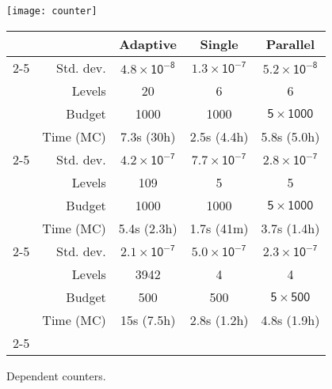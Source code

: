 \documentclass{llncs}
\providecommand{\tabularnewline}{\\}
\begin{document}
\begin{figure}
\begin{minipage}[t]{0.48\columnwidth}\texttt{[image: counter]}

\protect\caption{Dependent counters.\label{fig:counters}}
\end{minipage}\quad{}\begin{minipage}[t]{0.5\columnwidth}\textsf{\scriptsize{}}\begin{tabular}[b]{r|rccc|}
\multicolumn{1}{r}{} &  & \textsf{\scriptsize{}Adaptive} & \textsf{\scriptsize{}Single} & \multicolumn{1}{c}{\textsf{\scriptsize{}Parallel}}\tabularnewline
\cline{2-5} 
\multirow{4}{*}{\begin{turn}{90}
\textsf{\scriptsize{}Leader}
\end{turn}} & \textsf{\scriptsize{}Std. dev.} & \textsf{\scriptsize{}$\mathsf{4.8\times10^{-8}}$} & \textsf{\scriptsize{}$\mathsf{1.3\times10^{-7}}$} & \textsf{\scriptsize{}$\mathsf{5.2\times10^{-8}}$}\tabularnewline
 & \textsf{\scriptsize{}Levels} & \textsf{\scriptsize{}20} & \textsf{\scriptsize{}6} & \textsf{\scriptsize{}6}\tabularnewline
 & \textsf{\scriptsize{}Budget} & \textsf{\scriptsize{}1000} & \textsf{\scriptsize{}1000} & \textsf{\scriptsize{}$\mathsf{5\times1000}$}\tabularnewline
 & \textsf{\scriptsize{}Time (MC)} & \textsf{\scriptsize{}7.3s (30h)} & \textsf{\scriptsize{}2.5s (4.4h)} & \textsf{\scriptsize{}5.8s (5.0h)}\tabularnewline
\cline{2-5} 
\multirow{4}{*}{\begin{turn}{90}
\textsf{\scriptsize{}Philosophers}
\end{turn}} & \textsf{\scriptsize{}Std. dev.} & \textsf{\scriptsize{}$\mathsf{4.2\times10^{-7}}$} & \textsf{\scriptsize{}$\mathsf{7.7\times10^{-7}}$} & \textsf{\scriptsize{}$\mathsf{2.8\times10^{-7}}$}\tabularnewline
 & \textsf{\scriptsize{}Levels} & \textsf{\scriptsize{}109} & \textsf{\scriptsize{}5} & \textsf{\scriptsize{}5}\tabularnewline
 & \textsf{\scriptsize{}Budget} & \textsf{\scriptsize{}1000} & \textsf{\scriptsize{}1000} & \textsf{\scriptsize{}$\mathsf{5\times1000}$}\tabularnewline
 & \textsf{\scriptsize{}Time (MC)} & \textsf{\scriptsize{}5.4s (2.3h)} & \textsf{\scriptsize{}1.7s (41m)} & \textsf{\scriptsize{}3.7s (1.4h)}\tabularnewline
\cline{2-5} 
\multirow{4}{*}{\begin{turn}{90}
\textsf{\scriptsize{}Counters}
\end{turn}} & \textsf{\scriptsize{}Std. dev.} & \textsf{\scriptsize{}$\mathsf{2.1\times10^{-7}}$} & \textsf{\scriptsize{}$\mathsf{5.0\times10^{-7}}$} & \textsf{\scriptsize{}$\mathsf{2.3\times10^{-7}}$}\tabularnewline
 & \textsf{\scriptsize{}Levels} & \textsf{\scriptsize{}3942} & \textsf{\scriptsize{}4} & \textsf{\scriptsize{}4}\tabularnewline
 & \textsf{\scriptsize{}Budget} & \textsf{\scriptsize{}500} & \textsf{\scriptsize{}500} & \textsf{\scriptsize{}$\mathsf{5\times500}$}\tabularnewline
 & \textsf{\scriptsize{}Time (MC)} & \textsf{\scriptsize{}15s (7.5h)} & \textsf{\scriptsize{}2.8s (1.2h)} & \textsf{\scriptsize{}4.8s (1.9h)}\tabularnewline
\cline{2-5} 
\end{tabular}{\scriptsize \par}


\end{minipage}
\end{figure}
\end{document}

